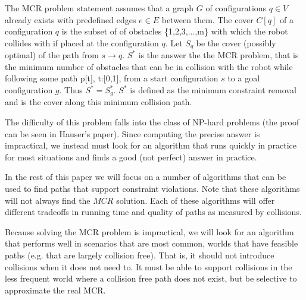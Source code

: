 The MCR problem statement assumes that a graph $G$ of configurations $q \in V$ already exists with predefined edges $e \in E$ between them. The cover $C[q]$ of a configuration $q$ is the subset of of obstacles \{1,2,3,...,m\} with which the robot collides with if placed at the configuration $q$. Let $S_q$ be the cover (possibly optimal) of the path from $s \rightarrow q$. $S^{*}$ is the answer the the MCR problem, that is the minimum number of obstacles that can be in collision with the robot while following some path p[t], t:[0,1], from a start configuration $s$ to a goal configuration $g$. Thus $S^{*} = S^{*}_g$. $S^{*}$ is defined as the minimum constraint removal and is the cover along this minimum collision path. 

The difficulty of this problem falls into the class of NP-hard problems (the proof can be seen in Hauser's paper). Since computing the precise answer is impractical, we instead must look for an algorithm that runs quickly in practice for most situations and finds a good (not perfect) answer in practice.

In the rest of this paper we will focus on a number of algorithms that can be used to find paths that support constraint violations. Note that these algorithms will not always find the $MCR$ solution. Each of these algorithms will offer different tradeoffs in running time and quality of paths as measured by collisions.

Because solving the MCR problem is impractical, we will look for an algorithm that performs well in scenarios that are most common, worlds that have feasible paths (e.g. that are largely collision free). That is, it should not introduce collisions when it does not need to. It must be able to support collisions in the less frequent world where a collision free path does not exist, but be selective to approximate the real MCR.
